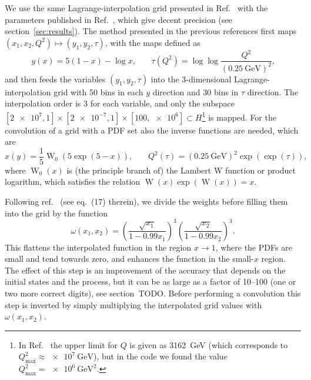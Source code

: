 We use the same Lagrange-interpolation grid presented in Ref.~\cite{Carli:2010rw} with the parameters published in Ref.~\cite{Bertone:2014zva}, which give decent precision (see section~\ref{sec:results}).
The method presented in the previous references first maps $(x_1, x_2, Q^2) \mapsto (y_1, y_2, \tau)$, with the maps defined as
\begin{equation}
y(x) = 5 (1-x) - \log x \text{,} \qquad \tau (Q^2) = \log \log \frac{Q^2}{(\SI{0.25}{\giga\electronvolt})^2} \text{,}
\end{equation}
and then feeds the variables $(y_1, y_2, \tau)$ into the 3-dimensional Lagrange-interpolation grid with 50 bins in each $y$ direction and 30 bins in $\tau$ direction.
The interpolation order is 3 for each variable, and only the subspace $[\num{2e7},1] \times [\num{2e-7},1] \times [100,\num{e6}] \subset H$\footnote{In Ref.~\cite{Bertone:2014zva} the upper limit for $Q$ is given as \SI{3162}{\giga\electronvolt} (which corresponds to $Q_\mathrm{max}^2 \approx \SI{e7}{\giga\electronvolt}$), but in the code we found the value $Q_\mathrm{max}^2 = \SI{e6}{\giga\electronvolt\squared}$.} is mapped.
For the convolution of a grid with a PDF set also the inverse functions are needed, which are
\begin{equation}
x(y) = \frac{1}{5} \operatorname{W}_0 (5 \exp (5-x)) \text{,} \qquad Q^2 (\tau) = (\SI{0.25}{\giga\electronvolt})^2 \exp (\exp (\tau)) \text{,}
\end{equation}
where $\operatorname{W}_0 (x)$ is (the principle branch of) the Lambert W function or product logarithm, which satisfies the relation $\operatorname{W} (x) \exp (\operatorname{W} (x)) = x$.

Following ref.~\cite{Carli:2010rw} (see eq.~(17) therein), we divide the weights before filling them into the grid by the function
\begin{equation}
\omega (x_1, x_2) = \left( \frac{\sqrt{x_1}}{1 - 0.99 x_1} \right)^3 \left( \frac{\sqrt{x_2}}{1 - 0.99 x_2} \right)^3 \text{.}
\end{equation}
This flattens the interpolated function in the region $x \to 1$, where the PDFs are small and tend towards zero, and enhances the function in the small-$x$ region.
The effect of this step is an improvement of the accuracy that depends on the initial states and the process, but it can be as large as a factor of \numrange{10}{100} (one or two more correct digits), see section~TODO.
Before performing a convolution this step is inverted by simply multiplying the interpolated grid values with $\omega (x_1, x_2)$.

